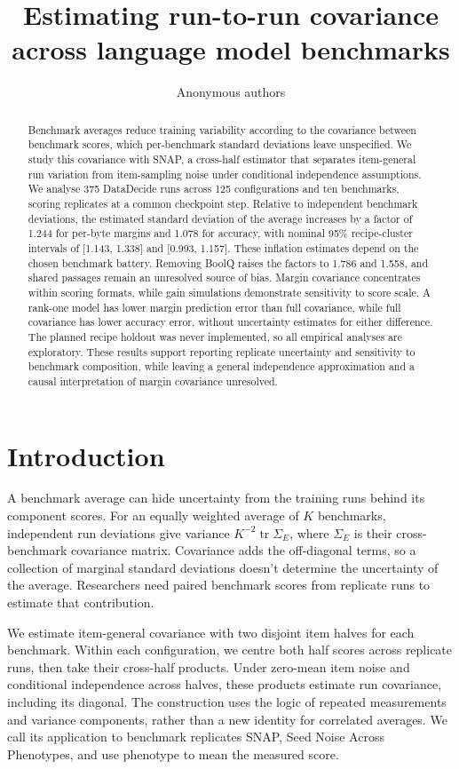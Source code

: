 \documentclass{article}
\title{Estimating run-to-run covariance across language model benchmarks}
\author{Anonymous authors}
\newcommand{\Sig}{\Sigma_E}
\begin{document}
\maketitle
\begin{abstract}
Benchmark averages reduce training variability according to the covariance between benchmark scores, which per-benchmark standard deviations leave unspecified. We study this covariance with SNAP, a cross-half estimator that separates item-general run variation from item-sampling noise under conditional independence assumptions. We analyse 375 DataDecide runs across 125 configurations and ten benchmarks, scoring replicates at a common checkpoint step. Relative to independent benchmark deviations, the estimated standard deviation of the average increases by a factor of 1.244 for per-byte margins and 1.078 for accuracy, with nominal 95\% recipe-cluster intervals of [1.143, 1.338] and [0.993, 1.157]. These inflation estimates depend on the chosen benchmark battery. Removing BoolQ raises the factors to 1.786 and 1.558, and shared passages remain an unresolved source of bias. Margin covariance concentrates within scoring formats, while gain simulations demonstrate sensitivity to score scale. A rank-one model has lower margin prediction error than full covariance, while full covariance has lower accuracy error, without uncertainty estimates for either difference. The planned recipe holdout was never implemented, so all empirical analyses are exploratory. These results support reporting replicate uncertainty and sensitivity to benchmark composition, while leaving a general independence approximation and a causal interpretation of margin covariance unresolved.
\end{abstract}

\section{Introduction}
A benchmark average can hide uncertainty from the training runs behind its component scores. For an equally weighted average of $K$ benchmarks, independent run deviations give variance $K^{-2}\operatorname{tr}\Sig$, where $\Sig$ is their cross-benchmark covariance matrix. Covariance adds the off-diagonal terms, so a collection of marginal standard deviations doesn't determine the uncertainty of the average. Researchers need paired benchmark scores from replicate runs to estimate that contribution.

We estimate item-general covariance with two disjoint item halves for each benchmark. Within each configuration, we centre both half scores across replicate runs, then take their cross-half products. Under zero-mean item noise and conditional independence across halves, these products estimate run covariance, including its diagonal. The construction uses the logic of repeated measurements and variance components, rather than a new identity for correlated averages. We call its application to benchmark replicates SNAP, Seed Noise Across Phenotypes, and use phenotype to mean the measured score.
\end{document}
